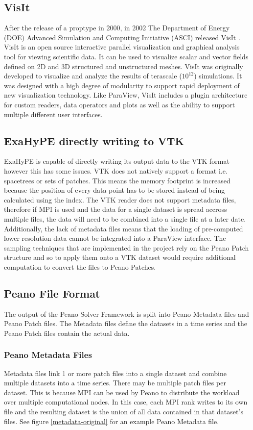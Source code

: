 \documentclass[12pt,a4paper]{article}
\begin{document}
\subsection{VisIt}
After the release of a proptype in 2000, in 2002 The Department of Energy (DOE) Advanced Simulation and Computing Initiative (ASCI) released VisIt \cite{VisIt}. VisIt is an open source interactive parallel visualization and graphical analysis tool for viewing scientific data. It can be used to visualize scalar and vector fields defined on 2D and 3D structured and unstructured meshes. VisIt was originally developed to visualize and analyze the results of terascale ($10^{12}$) simulations. It was designed with a high degree of modularity to support rapid deployment of new visualization technology. Like ParaView, VisIt includes a plugin architecture for custom readers, data operators and plots as well as the ability to support multiple different user interfaces.

\subsection{ExaHyPE directly writing to VTK}
ExaHyPE is capable of directly writing its output data to the VTK format however this has some issues. VTK does not natively support a format i.e. spacetrees or sets of patches. This means the memory footprint is increased because the position of every data point has to be stored instead of being calculated using the index. The VTK reader does not support metadata files, therefore if MPI \cite{MPI} is used and the data for a single dataset is spread accross multiple files, the data will need to be combined into a single file at a later date. Additionally, the lack of metadata files means that the loading of pre-computed lower resolution data cannot be integrated into a ParaView interface. The sampling techniques that are implemented in the project rely on the Peano Patch structure and so to apply them onto a VTK dataset would require additional computation to convert the files to Peano Patches.

\subsection{Peano File Format}
The output of the Peano Solver Framework is split into Peano Metadata files and Peano Patch files. The Metadata files define the datasets in a time series and the Peano Patch files contain the actual data.

\subsubsection{Peano Metadata Files}
Metadata files link 1 or more patch files into a single dataset and combine multiple datasets into a time series. There may be multiple patch files per dataset. This is because MPI \cite{MPI} can be used by Peano to distribute the workload over multiple computational nodes. In this case, each MPI rank writes to its own file and the resulting dataset is the union of all data contained in that dataset's files. See figure \ref{metadata-original} for an example Peano Metadata file.
\end{document}
